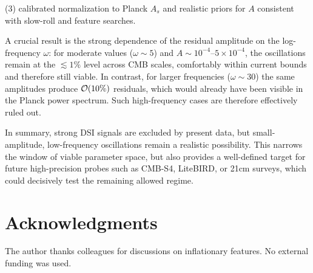 \documentclass[12pt]{article}
\begin{document}
(3) calibrated normalization to Planck $A_s$ and realistic priors for $A$ consistent with slow-roll and feature searches.

A crucial result is the strong dependence of the residual amplitude on the log-frequency $\omega$:  
for moderate values ($\omega\sim 5$) and $A\sim 10^{-4}$--$5\times10^{-4}$, the oscillations remain at the $\lesssim 1\%$ level across CMB scales, comfortably within current bounds and therefore still viable.  
In contrast, for larger frequencies ($\omega\sim 30$) the same amplitudes produce ${\cal O}(10\%)$ residuals, which would already have been visible in the Planck power spectrum. Such high-frequency cases are therefore effectively ruled out.

In summary, strong DSI signals are excluded by present data, but small-amplitude, low-frequency oscillations remain a realistic possibility. This narrows the window of viable parameter space, but also provides a well-defined target for future high-precision probes such as CMB-S4, LiteBIRD, or 21cm surveys, which could decisively test the remaining allowed regime.


\section*{Acknowledgments}
The author thanks colleagues for discussions on inflationary features. No external funding was used.



\end{document}
